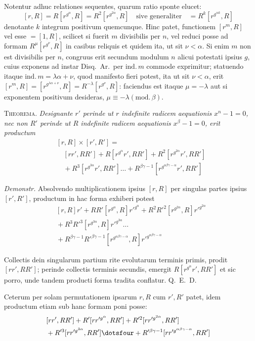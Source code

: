 Notentur adhuc relationes sequentes, quarum ratio sponte elucet:
\[
[r,R]=R[r^{g^\alpha},R]=R^2[r^{g^{2\alpha}},R]\quad\text{sive generaliter}\quad=R^k[r^{g^{\alpha k}},R]
\]
denotante $k$ integrum positivum quemcunque. Hinc patet, functionem $[r^m,R]$ vel esse $=[1,R]$, scilicet si fuerit $m$ divisibilis per $n$, vel reduci posse ad formam $R^\mu[r^{g^\nu},R]$ in casibus reliquis et quidem ita, ut sit $\nu<\alpha$. Si enim $m$ non est divisibilis per $n$, congruus erit secundum modulum $n$ alicui potestati ipsius $g$, cuius exponens ad instar Disq.\ Ar.\ per $\mathrm{ind.}\,m$ commode exprimitur; statuendo itaque $\mathrm{ind.}\,m=\lambda\alpha+\nu$, quod manifesto fieri potest, ita ut sit $\nu<\alpha$, erit $[r^m,R]=[r^{g^{\lambda\alpha+\nu}},R]=R^{-\lambda}[r^{g^\nu},R]$: faciendus est itaque $\mu=-\lambda$ aut si exponentem positivum desideras, $\mu\equiv-\lambda(\mathrm{mod.}\,\beta)$.

\textsc{Theorema.} \emph{Designante $r'$ perinde ut $r$ indefinite radicem aequationis $x^n-1=0$, nec non $R'$ perinde ut $R$ indefinite radicem aequationis $x^\beta-1=0$, erit productum}
\[
\begin{aligned}
&[r,R]\times[r',R']=\\
&\quad[rr',RR']+R[r^{g^\alpha}r',RR']+R^2[r^{g^{2\alpha}}r',RR']\\
&\quad{}+R^3[r^{g^{3\alpha}}r',RR']\ldots+R^{\beta\gamma-1}[r^{g^{\alpha\beta\gamma-\alpha}}r',RR']
\end{aligned}
\]

\emph{Demonstr.} Absolvendo multiplicationem ipsius $[r,R]$ per singulas partes ipsius $[r',R']$, productum in hac forma exhiberi potest
\[
\begin{aligned}
&[r,R]r'+RR'[r^{g^\alpha},R]r'^{g^\alpha}+R^2R'^2[r^{g^{2\alpha}},R]r'^{g^{2\alpha}}\\
&{}+R^3R'^3[r^{g^{3\alpha}},R]r'^{g^{3\alpha}}\ldots\\
&{}+R^{\beta\gamma-1}R'^{\beta\gamma-1}[r^{g^{\alpha\beta\gamma-\alpha}},R]r'^{g^{\alpha\beta\gamma-\alpha}}
\end{aligned}
\]

Collectis dein singularum partium rite evolutarum terminis primis, prodit $[rr',RR']$; perinde collectis terminis secundis, emergit $R[r^{g^\alpha}r',RR']$ et sic porro, unde tandem producti forma tradita conflatur. Q.\ E.\ D.

Ceterum per solam permutationem ipsarum $r,R$ cum $r',R'$ patet, idem productum etiam sub hanc formam poni posse:
\[
\begin{aligned}
&[rr',RR']+R'[rr'^{g^\alpha},RR']+R'^2[rr'^{g^{2\alpha}},RR']\\
&{}+R'^3[rr'^{g^{3\alpha}},RR']\dotsfour+R'^{\beta\gamma-1}[rr'^{g^{\alpha\beta\gamma-\alpha}},RR']
\end{aligned}
\]

